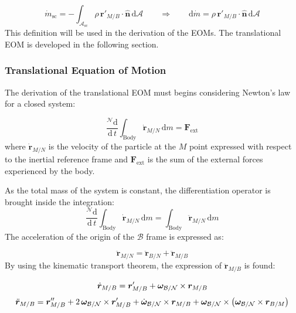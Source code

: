 \begin{equation}\label{eq:cambVar}
	\dot{m}_\text{sc} = - \int_{\mathcal{A}_\text{sc}} \rho\,\bm{r}'_{M/B} \cdot \hat{\bm{n}}\,\text{d}\mathcal{A} \qquad \Rightarrow \qquad \text{d}\dot{m} = \rho\,\bm{r}'_{M/B} \cdot \hat{\bm{n}}\,\text{d}\mathcal{A}
\end{equation}
This definition will be used in the derivation of the EOMs. The translational EOM is developed in the following section.

\subsubsection{Translational Equation of Motion}
The derivation of the translational EOM must begins considering Newton's law for a closed system:

\begin{equation}\label{eq:eq3}
	\frac{^{\mathcal{N}}\text{d}}{\text{d}\,t}\int_{\text{Body}}\dot{\bm{r}}_{M/N}\,	\text{d}m= \bm{F}_{\text{ext}}
\end{equation}
where $\dot{\bm{r}}_{M/N}$ is the velocity of the particle at the $M$ point expressed with respect to the inertial reference frame and $\bm{F}_{\text{ext}}$ is the sum of the external forces experienced by the body.

As the total mass of the system is constant, the differentiation operator is brought inside the integration: 
\begin{equation}\label{eq:eq4}
	\frac{^{\mathcal{N}}\text{d}}{\text{d}\,t}\int_{\text{Body}}\dot{\bm{r}}_{M/N}\,	\text{d}m= \int_{\text{Body}}\ddot{\bm{r}}_{M/N}\,\text{d}m
\end{equation}
The acceleration of the origin of the $\mathcal{B}$ frame is expressed as:

\begin{equation}\label{eq:RcRbacc}
	\ddot{\bm{r}}_{M/N} = \ddot{\bm{r}}_{B/N} + \ddot{\bm{r}}_{M/B}
\end{equation}
By using the kinematic transport theorem, the expression of $\ddot{\bm{r}}_{M/B}$ is found:

\begin{equation}\label{eq:rMB_ddot}
	\dot{\bm{r}}_{M/B} = \bm{r}'_{M/B} + \bm{\omega}_{\cal{B}/\cal{N}}\times\bm{r}_{M/B}
\end{equation}
\begin{equation}\label{eq:rMB_dot}
	\ddot{\bm{r}}_{M/B} = \bm{r}''_{M/B}+2\,\bm{\omega}_{\cal{B}/\cal{N}}\times
	\bm{r}'_{M/B} + \dot{\bm{\omega}}_{\cal{B}/\cal{N}}\times \bm{r}_{M/B} + \bm{\omega}_{\cal{B}/\cal{N}}\times\left(\bm{\omega}_{\cal{B}/\cal{N}} \times \bm{r}_{B/M} \right)
\end{equation}

